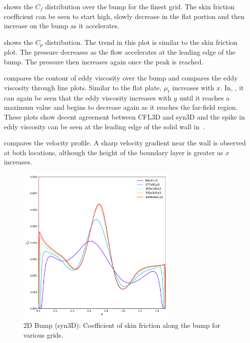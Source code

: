  shows the $C_f$ distribution over the bump for the finest grid. The skin friction coefficient can be seen to start high, slowly decrease in the flat portion and then increase on the bump as it accelerates.

 shows the $C_p$ distribution. The trend in this plot is similar to the skin friction plot. The pressure decreases as the flow accelerates at the leading edge of the bump. The pressure then increases again once the peak is reached.

 compares the contour of eddy viscosity over the bump and  compares the eddy viscosity through line plots. Similar to the flat plate, $\mu_t$ increases with $x$. In, , it can again be seen that the eddy viscosity increases with $y$ until it reaches a maximum value and begins to decrease again as it reaches the far-field region.
These plots show decent agreement between CFL3D and syn3D and the spike in eddy viscosity can be seen at the leading edge of the solid wall in~.

 compares the velocity profile. A sharp velocity gradient near the wall is observed at both locations, although the height of the boundary layer is greater as $x$ increases.
\begin{figure}[ht!]
\centering
  \includegraphics[width=0.7\textwidth]{figs/2dbump/CfGridStudy.pdf}
    \caption{2D Bump (syn3D): Coefficient of skin friction along the bump for various grids.}
    \label{fig:syn2dbumpcfstudy}
\end{figure}

